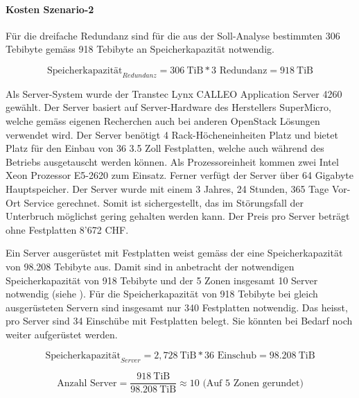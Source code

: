 \paragraph*{Kosten Szenario-2}

Für die dreifache Redundanz sind für die aus der Soll-Analyse bestimmten 306 Tebibyte gemäss  918 Tebibyte an Speicherkapazität notwendig.

\begin{equation}
\mbox{Speicherkapazität}_{Redundanz} = 306 \mathrm{\ TiB} * 3 \mbox{\ Redundanz} = 918 \mathrm{\ TiB}
\label{eqn:SpeicherkapazitätS2}
\end{equation}


Als Server-System wurde der Transtec Lynx CALLEO Application Server 4260 gewählt. Der Server basiert auf Server-Hardware des Herstellers SuperMicro, welche gemäss eigenen Recherchen auch bei anderen OpenStack Lösungen verwendet wird. Der Server benötigt 4 Rack-Höcheneinheiten Platz und bietet Platz für den Einbau von 36 3.5 Zoll Festplatten, welche auch während des Betriebs ausgetauscht werden können. Als Prozessoreinheit kommen zwei Intel Xeon Prozessor E5-2620 zum Einsatz. Ferner verfügt der Server über 64 Gigabyte Hauptspeicher. Der Server wurde mit einem 3 Jahres, 24 Stunden, 365 Tage Vor-Ort Service gerechnet. Somit ist sichergestellt, das im Störungsfall der Unterbruch möglichst gering gehalten werden kann. Der Preis pro Server beträgt ohne Festplatten 8'672 CHF.


Ein Server ausgerüstet mit Festplatten weist gemäss der  eine Speicherkapazität von 98.208 Tebibyte aus. Damit sind in anbetracht der notwendigen Speicherkapazität von 918 Tebibyte und der 5 Zonen insgesamt 10 Server notwendig (siehe ). Für die Speicherkapazität von 918 Tebibyte bei gleich ausgerüsteten Servern sind insgesamt nur 340 Festplatten notwendig. Das heisst, pro Server sind 34 Einschübe mit Festplatten belegt. Sie könnten bei Bedarf noch weiter aufgerüstet werden.

\begin{equation}
\mbox{Speicherkapazität}_{Server} = 2,728 \mathrm{\ TiB} * 36 \mbox{\ Einschub} = 98.208 \mathrm{\ TiB}
\label{eqn:SpeicherkapazitätServerS2}
\end{equation}

\begin{equation}
\mbox{Anzahl Server} = \frac{918 \mathrm{\ TiB}}{98.208 \mathrm{\ TiB}} \approx 10 \mbox{\ (Auf 5 Zonen gerundet)}
\label{eqn:AnzahlServerS2}
\end{equation}

